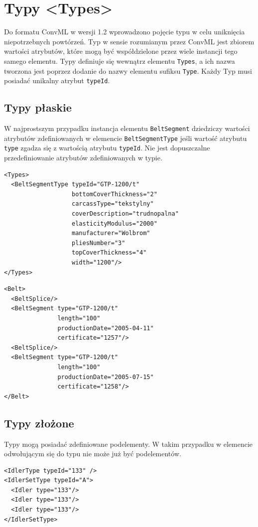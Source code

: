\documentclass[12pt,a4paper]{article}
\begin{document}
\section{Typy <Types>}
Do formatu ConvML w wersji 1.2 wprowadzono pojęcie typu w celu uniknięcia
niepotrzebnych powtórzeń.  Typ w sensie rozumianym przez ConvML jest zbiorem
wartości atrybutów, które mogą być współdzielone przez wiele instancji tego
samego elementu.  Typy definiuje się wewnątrz elementu {\tt Types}, a ich nazwa
tworzona jest poprzez dodanie do nazwy elementu sufiksu {\tt Type}. Każdy Typ
musi posiadać unikalny atrybut {\tt typeId}.


\subsection{Typy płaskie}
W najprostszym przypadku instancja elementu {\tt BeltSegment} dziedziczy
wartości atrybutów zdefiniowanych w elemencie {\tt BeltSegmentType} jeśli
wartość atrybutu {\tt type} zgadza się z wartością atrybutu {\tt typeId}.  Nie
jest dopuszczalne przedefiniowanie atrybutów zdefiniowanych w typie.

\begin{verbatim}
<Types>
  <BeltSegmentType typeId="GTP-1200/t"
                   bottomCoverThickness="2"
                   carcassType="tekstylny"
                   coverDescription="trudnopalna"
                   elasticityModulus="2000"
                   manufacturer="Wolbrom"
                   pliesNumber="3"
                   topCoverThickness="4"
                   width="1200"/>
</Types>
\end{verbatim}

\begin{verbatim}
<Belt>
  <BeltSplice/>
  <BeltSegment type="GTP-1200/t"
               length="100"
               productionDate="2005-04-11"
               certificate="1257"/>
  <BeltSplice/>
  <BeltSegment type="GTP-1200/t"
               length="100"
               productionDate="2005-07-15"
               certificate="1258"/>
</Belt>
\end{verbatim}


\subsection{Typy złożone}
Typy mogą posiadać zdefiniowane podelementy.  W takim przypadku w elemencie
odwołującym się do typu nie może już być podelementów.

\begin{verbatim}
<IdlerType typeId="133" />
<IdlerSetType typeId="A">
  <Idler type="133"/>
  <Idler type="133"/>
  <Idler type="133"/>
</IdlerSetType>
\end{verbatim}
\end{document}

